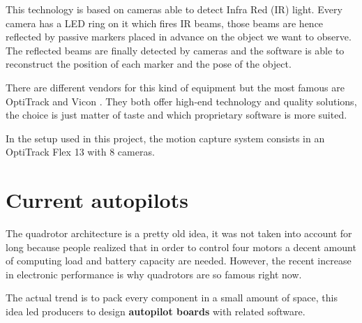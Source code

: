 This technology is based on cameras able to detect Infra Red (IR) light. Every camera has a LED ring on it which fires IR beams, those beams are hence reflected by passive markers placed in advance on the object we want to observe. The reflected beams are finally detected by cameras and the software is able to reconstruct the position of each marker and the pose of the object.\par
There are different vendors for this kind of equipment but the most famous are OptiTrack \cite{OptiT} and Vicon \cite{vicon}. They both offer high-end technology and quality solutions, the choice is just matter of taste and which proprietary software is more suited.\par In the setup used in this project, the motion capture system consists in an OptiTrack Flex 13 with 8 cameras.


\section{Current autopilots}

The quadrotor architecture is a pretty old idea, it was not taken into account for long because people realized that in order to control four motors a decent amount of computing load and battery capacity are needed. However, the recent increase in electronic performance is why quadrotors are so famous right now.\par The actual trend is to pack every component in a small amount of space, this idea led producers to design \textbf{autopilot boards} with related software.

